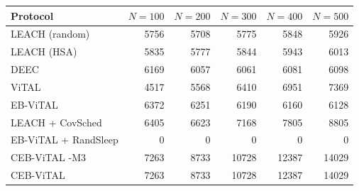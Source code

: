 \begin{tabular}{lrrrrr}
\hline
Protocol & $N=100$ & $N=200$ & $N=300$ & $N=400$ & $N=500$ \\
\hline
LEACH (random) & 5756 & 5708 & 5775 & 5848 & 5926 \\
LEACH (HSA) & 5835 & 5777 & 5844 & 5943 & 6013 \\
DEEC & 6169 & 6057 & 6061 & 6081 & 6098 \\
ViTAL & 4517 & 5568 & 6410 & 6951 & 7369 \\
EB-ViTAL & 6372 & 6251 & 6190 & 6160 & 6128 \\
LEACH + CovSched & 6405 & 6623 & 7168 & 7805 & 8805 \\
EB-ViTAL + RandSleep & 0 & 0 & 0 & 0 & 0 \\
CEB-ViTAL -M3 & 7263 & 8733 & 10728 & 12387 & 14029 \\
CEB-ViTAL & 7263 & 8733 & 10728 & 12387 & 14029 \\
\hline
\end{tabular}
